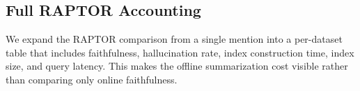 
\subsection{Full RAPTOR Accounting}
\label{sec:fix11_raptor}

We expand the RAPTOR comparison from a single mention into a per-dataset
table that includes faithfulness, hallucination rate, index construction
time, index size, and query latency. This makes the offline summarization
cost visible rather than comparing only online faithfulness.

